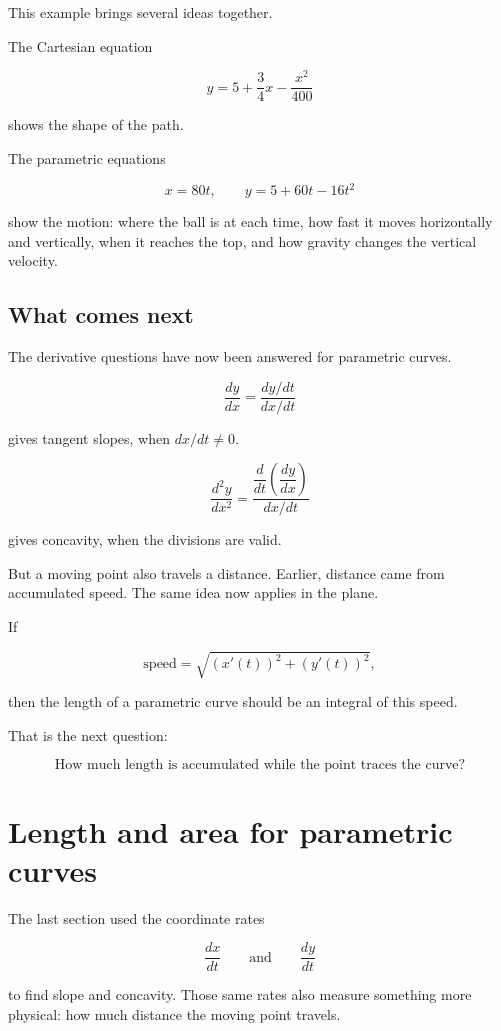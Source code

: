 This example brings several ideas together.

The Cartesian equation

\[
y=5+\frac34x-\frac{x^2}{400}
\]

shows the shape of the path.

The parametric equations

\[
x=80t,
\qquad
y=5+60t-16t^2
\]

show the motion: where the ball is at each time, how fast it moves horizontally and
vertically, when it reaches the top, and how gravity changes the vertical velocity.

\subsection{What comes next}
\label{subsec:parametric-calculus-what-next}

The derivative questions have now been answered for parametric curves.

\[
\frac{dy}{dx}
=
\frac{dy/dt}{dx/dt}
\]

gives tangent slopes, when \(dx/dt\neq0\).

\[
\frac{d^2y}{dx^2}
=
\frac{\dfrac{d}{dt}\left(\dfrac{dy}{dx}\right)}{dx/dt}
\]

gives concavity, when the divisions are valid.

But a moving point also travels a distance.  Earlier, distance came from accumulated
speed.  The same idea now applies in the plane.

If

\[
\text{speed}
=
\sqrt{(x'(t))^2+(y'(t))^2},
\]

then the length of a parametric curve should be an integral of this speed.

That is the next question:

\[
\boxed{
\text{How much length is accumulated while the point traces the curve?}
}
\]
\section{Length and area for parametric curves}
\label{sec:length-area-parametric-curves}

The last section used the coordinate rates

\[
\frac{dx}{dt}
\qquad\text{and}\qquad
\frac{dy}{dt}
\]

to find slope and concavity.  Those same rates also measure something more physical:
how much distance the moving point travels.

